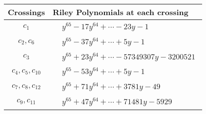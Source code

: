 \documentclass[1p]{elsarticle_modified}
\theoremstyle{definition}
\begin{document}
\begin{tabular}{m{50pt}|m{274pt}}
Crossings & \hspace{64pt}Riley Polynomials at each crossing \\
\hline $$\begin{aligned}c_{1}\end{aligned}$$&$\begin{aligned}
&y^{65}-17 y^{64}+\cdots-23 y-1
\end{aligned}$\\
\hline $$\begin{aligned}c_{2},c_{6}\end{aligned}$$&$\begin{aligned}
&y^{65}-37 y^{64}+\cdots+5 y-1
\end{aligned}$\\
\hline $$\begin{aligned}c_{3}\end{aligned}$$&$\begin{aligned}
&y^{65}+23 y^{64}+\cdots-57349307 y-3200521
\end{aligned}$\\
\hline $$\begin{aligned}c_{4},c_{5},c_{10}\end{aligned}$$&$\begin{aligned}
&y^{65}-53 y^{64}+\cdots+5 y-1
\end{aligned}$\\
\hline $$\begin{aligned}c_{7},c_{8},c_{12}\end{aligned}$$&$\begin{aligned}
&y^{65}+71 y^{64}+\cdots+3781 y-49
\end{aligned}$\\
\hline $$\begin{aligned}c_{9},c_{11}\end{aligned}$$&$\begin{aligned}
&y^{65}+47 y^{64}+\cdots+71481 y-5929
\end{aligned}$\\
\hline
\end{tabular}
\vskip 2pc
\end{document}
